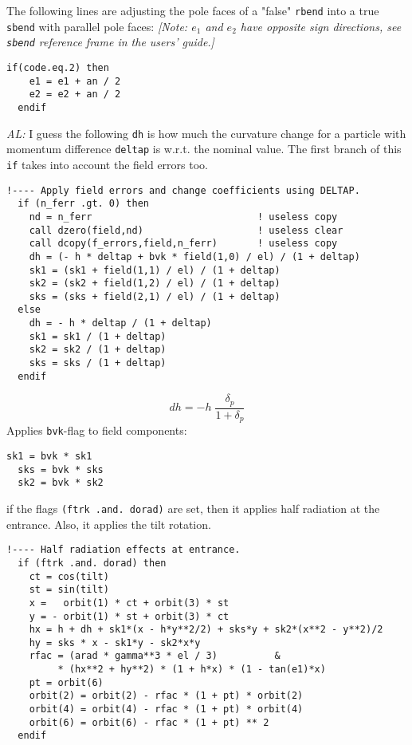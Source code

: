 \documentclass{cern-art} %
\renewcommand{\L}[1]{\lstinline[firstnumber=last]{#1}}
\begin{document}
The following lines are adjusting the pole faces of a "false" \L{rbend} into a true \L{sbend} with parallel pole faces: {\em [Note: $e_1$ and $e_2$ have opposite sign directions, see \L{sbend} reference frame in the users' guide.]}
\begin{lstlisting}[firstnumber=last]
  if(code.eq.2) then
    e1 = e1 + an / 2
    e2 = e2 + an / 2
  endif
\end{lstlisting}
{\em AL:} I guess the following \L{dh} is how much the curvature change for a particle with momentum difference \L{deltap} is w.r.t. the nominal value. The first branch of this \L{if} takes into account the field errors too.
\begin{lstlisting}[firstnumber=last]
  !---- Apply field errors and change coefficients using DELTAP.
  if (n_ferr .gt. 0) then
    nd = n_ferr                             ! useless copy
    call dzero(field,nd)                    ! useless clear
    call dcopy(f_errors,field,n_ferr)       ! useless copy
    dh = (- h * deltap + bvk * field(1,0) / el) / (1 + deltap)
    sk1 = (sk1 + field(1,1) / el) / (1 + deltap)
    sk2 = (sk2 + field(1,2) / el) / (1 + deltap)
    sks = (sks + field(2,1) / el) / (1 + deltap)
  else
    dh = - h * deltap / (1 + deltap)
    sk1 = sk1 / (1 + deltap)
    sk2 = sk2 / (1 + deltap)
    sks = sks / (1 + deltap)
  endif
\end{lstlisting}
\[
dh = -h\; \frac{\delta_p}{1+\delta_p}
\]
Applies \L{bvk}-flag to field components:
\begin{lstlisting}[firstnumber=last]
  sk1 = bvk * sk1
  sks = bvk * sks
  sk2 = bvk * sk2
\end{lstlisting}
  if the flags \L{(ftrk .and. dorad)} are set, then it applies half radiation at the entrance. Also, it applies the tilt rotation.
\begin{lstlisting}[firstnumber=last]
  !---- Half radiation effects at entrance.
  if (ftrk .and. dorad) then
    ct = cos(tilt)
    st = sin(tilt)
    x =   orbit(1) * ct + orbit(3) * st
    y = - orbit(1) * st + orbit(3) * ct
    hx = h + dh + sk1*(x - h*y**2/2) + sks*y + sk2*(x**2 - y**2)/2
    hy = sks * x - sk1*y - sk2*x*y
    rfac = (arad * gamma**3 * el / 3)          &
         * (hx**2 + hy**2) * (1 + h*x) * (1 - tan(e1)*x)
    pt = orbit(6)
    orbit(2) = orbit(2) - rfac * (1 + pt) * orbit(2)
    orbit(4) = orbit(4) - rfac * (1 + pt) * orbit(4)
    orbit(6) = orbit(6) - rfac * (1 + pt) ** 2
  endif
\end{lstlisting}


\end{document}
